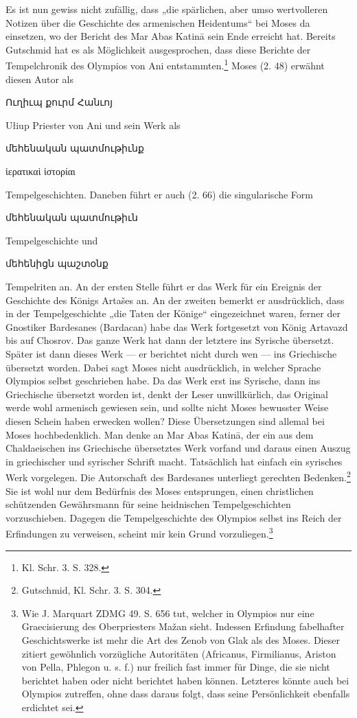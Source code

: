 \documentclass{article}
\begin{document}
Es ist nun gewiss nicht zufällig, dass „die spärlichen, aber umso wertvolleren Notizen über die Geschichte des armenischen Heidentums“ bei Moses da einsetzen, wo der Bericht des Mar Abas Katinā sein Ende erreicht hat. Bereits Gutschmid hat es als Möglichkeit ausgesprochen, dass diese Berichte der Tempelchronik des Olympios von Ani entstammten.\footnote{Kl. Schr. 3. S. 328.} Moses (2. 48) erwähnt diesen Autor als \begin{armenian}Ուղիւպ քուրմ Հանւոյ\end{armenian} Ułiup Priester von Ani und sein Werk als \begin{armenian}մեհենական պատմութիւնք\end{armenian} \begin{greek}ἱερατικαὶ ἱστορίαι\end{greek} Tempelgeschichten. Daneben führt er auch (2. 66) die singularische Form \begin{armenian}մեհենական պատմութիւն\end{armenian} Tempelgeschichte und \begin{armenian}մեհենիցն պաշտօնք\end{armenian} Tempelriten an. An der ersten Stelle führt er das Werk für ein Ereignis der Geschichte des Königs Artašes an. An der zweiten bemerkt er ausdrücklich, dass in der Tempelgeschichte „die Taten der Könige“ eingezeichnet waren, ferner der Gnostiker Bardesanes (Bardacan) habe das Werk fortgesetzt von König Artavazd bis auf Chosrov. Das ganze Werk hat dann der letztere ins Syrische übersetzt. Später ist dann dieses Werk — er berichtet nicht durch wen — ins Griechische übersetzt worden. Dabei sagt Moses nicht ausdrücklich, in welcher Sprache Olympios selbst geschrieben habe. Da das Werk erst ins Syrische, dann ins Griechische übersetzt worden ist, denkt der Leser unwillkürlich, das Original werde wohl armenisch gewiesen sein, und sollte nicht Moses bewusster Weise diesen Schein haben erwecken wollen? Diese Übersetzungen sind allemal bei Moses hochbedenklich. Man denke an Mar Abas Katinā, der ein aus dem Chaldaeischen ins Griechische übersetztes Werk vorfand und daraus einen Auszug in griechischer und syrischer Schrift macht. Tatsächlich hat einfach ein syrisches Werk vorgelegen. Die Autorschaft des Bardesanes unterliegt gerechten Bedenken.\footnote{Gutschmid, Kl. Schr. 3. S. 304.} Sie ist wohl nur dem Bedürfnis des Moses entsprungen, einen christlichen schützenden Gewährsmann für seine heidnischen Tempelgeschichten vorzuschieben. Dagegen die Tempelgeschichte des Olympios selbst ins Reich der Erfindungen zu verweisen, scheint mir kein Grund vorzuliegen.\footnote{Wie J. Marquart ZDMG 49. S. 656 tut, welcher in Olympios nur eine Graecisierung des Oberpriesters Mažan sieht. Indessen Erfindung fabelhafter Geschichtswerke ist mehr die Art des Zenob von Glak als des Moses. Dieser zitiert gewöhnlich vorzügliche Autoritäten (Africanus, Firmilianus, Ariston von Pella, Phlegon u. s. f.) nur freilich fast immer für Dinge, die sie nicht berichtet haben oder nicht berichtet haben können. Letzteres könnte auch bei Olympios zutreffen, ohne dass daraus folgt, dass seine Persönlichkeit ebenfalls erdichtet sei.}
\end{document}
